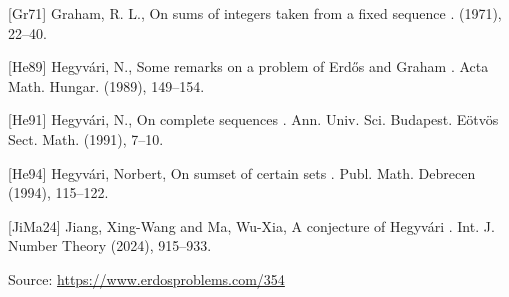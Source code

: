 \documentclass{article}
\begin{document}
[Gr71] Graham, R. L., On sums of integers taken from a fixed sequence . (1971), 22--40.

[He89] Hegyv\'{a}ri, N., Some remarks on a problem of {E}rd\H{o}s and {G}raham . Acta Math. Hungar. (1989), 149--154.

[He91] Hegyv\'{a}ri, N., On complete sequences . Ann. Univ. Sci. Budapest. E\"otv\"os Sect. Math. (1991), 7--10.

[He94] Hegyv\'{a}ri, Norbert, On sumset of certain sets . Publ. Math. Debrecen (1994), 115--122.

[JiMa24] Jiang, Xing-Wang and Ma, Wu-Xia, A conjecture of {H}egyv\'{a}ri . Int. J. Number Theory (2024), 915--933.


\bigskip
\noindent\small{Source: \url{https://www.erdosproblems.com/354}}
\end{document}
